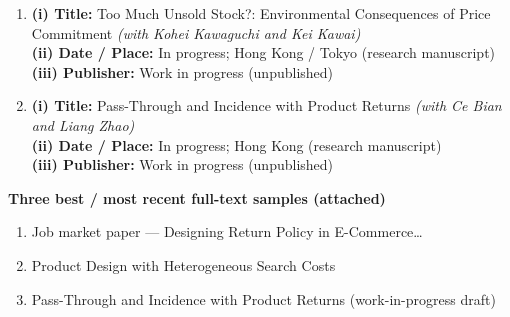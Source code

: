\documentclass[11pt]{article}
\begin{document}
\begin{enumerate}[leftmargin=*, itemsep=0.85em, resume]
\item
\textbf{(i) Title:} Too Much Unsold Stock?: Environmental Consequences of Price Commitment \textit{(with Kohei Kawaguchi and Kei Kawai)}\\
\textbf{(ii) Date / Place:} In progress; Hong Kong / Tokyo (research manuscript)\\
\textbf{(iii) Publisher:} Work in progress (unpublished)

\item
\textbf{(i) Title:} Pass-Through and Incidence with Product Returns \textit{(with Ce Bian and Liang Zhao)}\\
\textbf{(ii) Date / Place:} In progress; Hong Kong (research manuscript)\\
\textbf{(iii) Publisher:} Work in progress (unpublished)
\end{enumerate}

\vspace{0.7em}
{\large\bfseries Three best / most recent full-text samples (attached)}

\begin{enumerate}[leftmargin=*, itemsep=0.4em]
\item Job market paper --- Designing Return Policy in E-Commerce\ldots
\item Product Design with Heterogeneous Search Costs
\item Pass-Through and Incidence with Product Returns (work-in-progress draft)
\end{enumerate}
\end{document}
